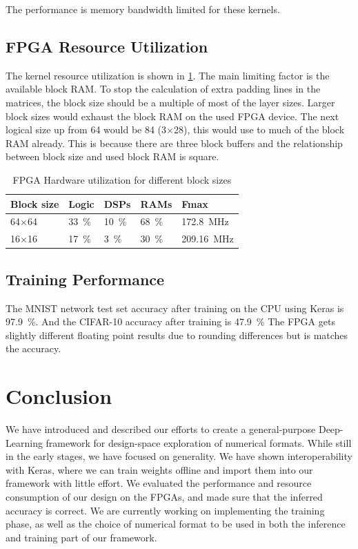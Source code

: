 \documentclass[techrep,english]{ipsj} %
\begin{document}
The performance is memory bandwidth limited for these kernels.

\subsection{FPGA Resource Utilization}
The kernel resource utilization is shown in \cref{tab:fpga-util}.
The main limiting factor is the available block RAM.
To stop the calculation of extra padding lines in the matrices, the block size should be a multiple of most of the layer sizes.
Larger block sizes would exhaust the block RAM on the used FPGA device.
The next logical size up from \num{64} would be \num{84} (\num{3}\(\times\)\num{28}), this would use to much of the block RAM already.
This is because there are three block buffers and the relationship between block size and used block RAM is square.

\begin{table}[h]
  \centering
  \caption{FPGA Hardware utilization for different block sizes}\label{tab:fpga-util}
  \begin{tabular}{lllll}
    \toprule
    \textbf{Block size} & \textbf{Logic} & \textbf{DSPs} & \textbf{RAMs} & \textbf{Fmax} \\
    \midrule    
    64$\times$64 & \SI{33}{\percent} & \SI{10}{\percent} & \SI{68}{\percent} & \SI{172.8}{\mega\hertz}  \\ %
    16$\times$16 & \SI{17}{\percent} & \SI{3}{\percent} & \SI{30}{\percent} & \SI{209.16}{\mega\hertz}  \\ %
    \bottomrule
  \end{tabular}
\end{table}

\subsection{Training Performance}
The MNIST network test set accuracy after training on the CPU using Keras is \SI{97.9}{\percent}.
And the CIFAR-10 accuracy after training is \SI{47.9}{\percent}
The FPGA gets slightly different floating point results due to rounding differences but is matches the accuracy.

\section{Conclusion}\label{sec:conclusion}
We have introduced and described our efforts to create a general-purpose Deep-Learning framework for design-space exploration of numerical formats. While still in the early stages, we have focused on generality. We have shown interoperability with Keras, where we can train weights offline and import them into our framework with little effort. We evaluated the performance and resource consumption of our design on the FPGAs, and made sure that the inferred accuracy is correct. We are currently working on implementing the training phase, as well as the choice of numerical format to be used in both the inference and training part of our framework.
\end{document}
